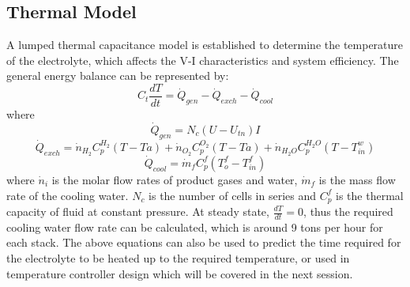 \subsection{Thermal Model}
A lumped thermal capacitance model is established to determine the temperature of the electrolyte, which affects the V-I characteristics and system efficiency. The general energy balance can be represented by:\cite{reversible}
\begin{equation}
C_t\frac{dT}{dt} = \dot{Q}_{gen}- \dot{Q}_{exch}-\dot{Q}_{cool}
\end{equation}
where 
\begin{equation}
\dot{Q}_{gen} = N_c(U-U_{tn})I 
\end{equation}
\begin{equation}
\dot{Q}_{exch} = \dot{n}_{H_2} C_p^{H_2}(T - Ta) + \dot{n}_{O_2}C_p^{O_2}(T - Ta)+ \dot{n}_{H_2O}C_p^{H_2O}(T - T_{in}^w)
\end{equation}
\begin{equation}
\dot{Q}_{cool} = \dot{m}_fC_p^f(T_o^f - T_{in}^f) 
\end{equation}
where $\dot{n}_i$ is the molar flow rates of product gases and water, $\dot{m}_f$ is the mass flow rate of the cooling water. $N_c$ is the number of cells in series and $C_p^f$ is the thermal capacity of fluid at constant pressure. At steady state, $\frac{dT}{dt} = 0$,  thus the required cooling water flow rate can be calculated, which is around 9 tons per hour for each stack. The above equations can also be used to predict the time required for the electrolyte to be heated up to the required temperature, or used in temperature controller design which will be covered in the next session.

